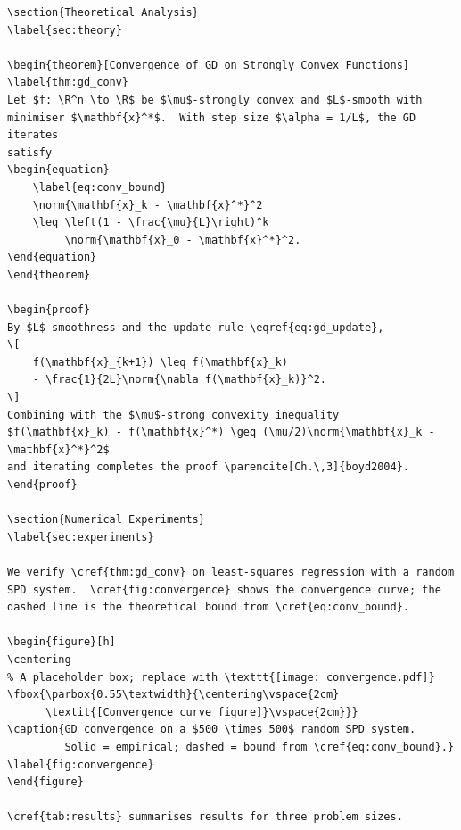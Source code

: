 \documentclass[12pt, a4paper]{article}
\newtheorem{theorem}{Theorem}[section]
\begin{document}
\begin{verbatim}
\section{Theoretical Analysis}
\label{sec:theory}

\begin{theorem}[Convergence of GD on Strongly Convex Functions]
\label{thm:gd_conv}
Let $f: \R^n \to \R$ be $\mu$-strongly convex and $L$-smooth with
minimiser $\mathbf{x}^*$.  With step size $\alpha = 1/L$, the GD iterates
satisfy
\begin{equation}
    \label{eq:conv_bound}
    \norm{\mathbf{x}_k - \mathbf{x}^*}^2
    \leq \left(1 - \frac{\mu}{L}\right)^k
         \norm{\mathbf{x}_0 - \mathbf{x}^*}^2.
\end{equation}
\end{theorem}

\begin{proof}
By $L$-smoothness and the update rule \eqref{eq:gd_update},
\[
    f(\mathbf{x}_{k+1}) \leq f(\mathbf{x}_k)
    - \frac{1}{2L}\norm{\nabla f(\mathbf{x}_k)}^2.
\]
Combining with the $\mu$-strong convexity inequality
$f(\mathbf{x}_k) - f(\mathbf{x}^*) \geq (\mu/2)\norm{\mathbf{x}_k - \mathbf{x}^*}^2$
and iterating completes the proof \parencite[Ch.\,3]{boyd2004}.
\end{proof}

\section{Numerical Experiments}
\label{sec:experiments}

We verify \cref{thm:gd_conv} on least-squares regression with a random
SPD system.  \cref{fig:convergence} shows the convergence curve; the
dashed line is the theoretical bound from \cref{eq:conv_bound}.

\begin{figure}[h]
\centering
% A placeholder box; replace with \texttt{[image: convergence.pdf]}
\fbox{\parbox{0.55\textwidth}{\centering\vspace{2cm}
      \textit{[Convergence curve figure]}\vspace{2cm}}}
\caption{GD convergence on a $500 \times 500$ random SPD system.
         Solid = empirical; dashed = bound from \cref{eq:conv_bound}.}
\label{fig:convergence}
\end{figure}

\cref{tab:results} summarises results for three problem sizes.


\end{verbatim}
\end{document}
